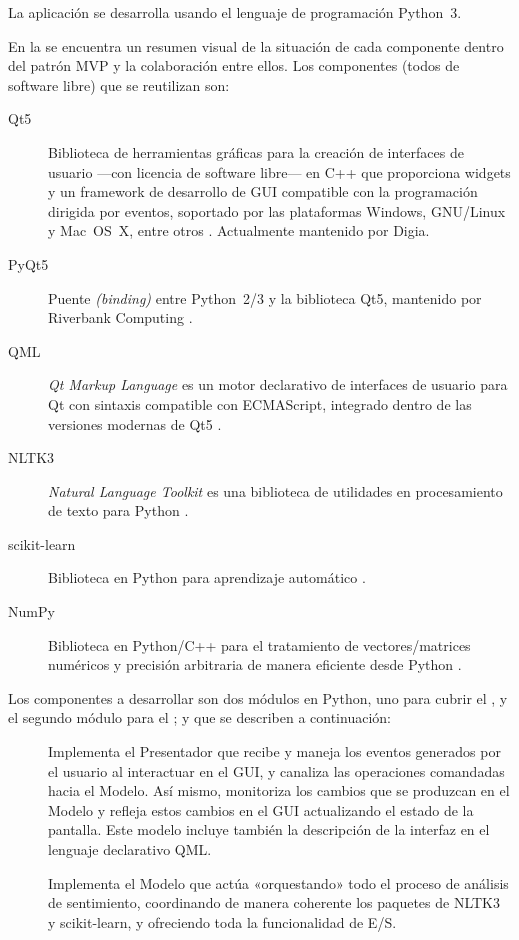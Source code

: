 La aplicación se desarrolla usando el lenguaje de programación Python~3.

En la  se encuentra un resumen visual de la situación de cada componente dentro del patrón MVP y la colaboración entre ellos.
Los componentes (todos de software libre) que se reutilizan son:
\begin{description}
\item[Qt5] Biblioteca de herramientas gráficas para la creación de interfaces de usuario ---con licencia de software libre--- en C++ que proporciona widgets y un framework de desarrollo de GUI compatible con la programación dirigida por eventos, soportado por las plataformas Windows, GNU/Linux y Mac~OS~X, entre otros \citep{Huang2015}. Actualmente mantenido por Digia.
\item[PyQt5] Puente \emph{(binding)} entre Python~2/3 y la biblioteca Qt5, mantenido por Riverbank Computing \citep{Summerfield2008}.
\item[QML] \emph{Qt Markup Language} es un motor declarativo de interfaces de usuario para Qt con sintaxis compatible con ECMAScript, integrado dentro de las versiones modernas de Qt5 \citep{web:QmlBook}.
\item[NLTK3] \emph{Natural Language Toolkit} es una biblioteca de utilidades en procesamiento de texto para Python \citep{Perkins2014}.
\item[scikit-learn] Biblioteca en Python para aprendizaje automático \citep{Pedregosa2011}.
\item[NumPy] Biblioteca en Python/C++ para el tratamiento de vectores/matrices numéricos y precisión arbitraria de manera eficiente desde Python \citep{Bressert2012}.
\end{description}

Los componentes a desarrollar son dos módulos en Python, uno para cubrir el , y el segundo módulo para el ; y que se describen a continuación:
\begin{description}
\item[] Implementa el Presentador que recibe y maneja los eventos generados por el usuario al interactuar en el GUI, y canaliza las operaciones comandadas hacia el Modelo. Así mismo, monitoriza los cambios que se produzcan en el Modelo y refleja estos cambios en el GUI actualizando el estado de la pantalla. Este modelo incluye también la descripción de la interfaz en el lenguaje declarativo QML.
\item[] Implementa el Modelo que actúa «orquestando» todo el proceso de análisis de sentimiento, coordinando de manera coherente los paquetes de NLTK3 y scikit-learn, y ofreciendo toda la funcionalidad de E/S.
\end{description}

